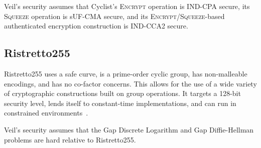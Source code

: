 Veil's security assumes that Cyclist's \textsc{Encrypt} operation is IND-CPA secure, its
\textsc{Squeeze} operation is sUF-CMA secure, and its
\textsc{Encrypt}/\textsc{Squeeze}-based authenticated encryption construction is IND-CCA2 secure.

\subsection{Ristretto255}\label{subsec:ristretto255}

Ristretto255 uses a safe curve, is a prime-order cyclic group, has non-malleable encodings, and has no
co-factor concerns.
This allows for the use of a wide variety of cryptographic constructions built on group operations.
It targets a 128-bit security level, lends itself to constant-time implementations, and can run in constrained
environments~\cite{deValence2018}.

Veil's security assumes that the Gap Discrete Logarithm and Gap Diffie-Hellman problems are hard relative to
Ristretto255.
